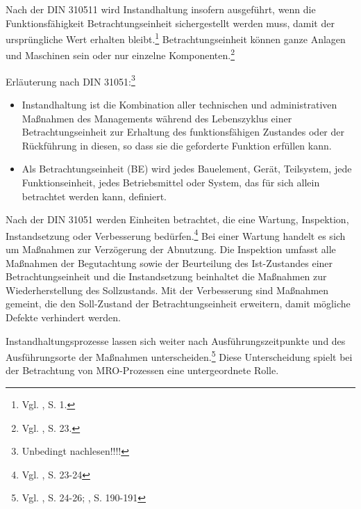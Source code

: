 Nach der DIN 310511 wird Instandhaltung insofern ausgeführt, wenn die Funktionsfähigkeit Betrachtungseinheit sichergestellt werden muss, damit der ursprüngliche Wert erhalten bleibt.\footnote{Vgl. \cite{Strunz:2012aa}, S. 1.} Betrachtungseinheit können ganze Anlagen und Maschinen sein oder nur einzelne Komponenten.\footnote{Vgl. \cite{schenk2010techSys}, S. 23.}

Erläuterung nach DIN 31051:\footnote{Unbedingt nachlesen!!!!}
\begin{itemize}
\item Instandhaltung ist die Kombination aller technischen und administrativen Maßnahmen des Managements während des Lebenszyklus einer Betrachtungseinheit zur Erhaltung des funktionsfähigen Zustandes oder der Rückführung in diesen, so dass sie die geforderte Funktion erfüllen kann.
\item Als Betrachtungseinheit (BE) wird jedes Bauelement, Gerät, Teilsystem, jede Funktionseinheit, jedes Betriebsmittel oder System, das für sich allein betrachtet werden kann, definiert.
\end{itemize}

Nach der DIN 31051 werden Einheiten betrachtet, die eine Wartung, Inspektion, Instandsetzung oder Verbesserung bedürfen.\footnote{Vgl. \cite{schenk2010techSys}, S. 23-24} Bei einer Wartung handelt es sich um Maßnahmen zur Verzögerung der Abnutzung. Die Inspektion umfasst alle Maßnahmen der Begutachtung sowie der Beurteilung des Ist-Zustandes einer Betrachtungseinheit und die Instandsetzung beinhaltet die Maßnahmen zur Wiederherstellung des Sollzustands. Mit der Verbesserung sind Maßnahmen gemeint, die den Soll-Zustand der Betrachtungseinheit erweitern, damit mögliche Defekte verhindert werden.

Instandhaltungsprozesse lassen sich weiter nach Ausführungszeitpunkte und des Ausführungsorte der Maßnahmen unterscheiden.\footnote{Vgl. \cite{schenk2010techSys}, S. 24-26; \cite{hinsch2010instandhaltung}, S. 190-191} Diese Unterscheidung spielt bei der Betrachtung von MRO-Prozessen eine untergeordnete Rolle. 

